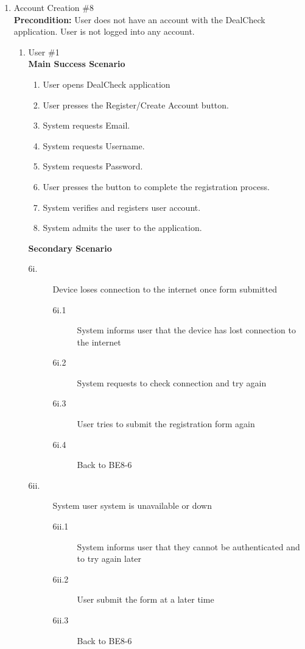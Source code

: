 \documentclass[]{article}
\begin{document}
\begin{enumerate}[{\bf {BE}1.}]
\item Account Creation \#8 \\
{\bf Precondition:} User does not have an account with the DealCheck application. User is not logged into any account.
\begin{enumerate}[{\bf VP1.}]
    \item User \#1 \\
    {\bf Main Success Scenario}
    \begin{enumerate}[1.]
        \item User opens DealCheck application
        \item User presses the Register/Create Account button.
        \item System requests Email.
        \item System requests Username.
        \item System requests Password.
        \item User presses the button to complete the registration process.
        \item System verifies and registers user account.
        \item System admits the user to the application.
        
    \end{enumerate}
    {\bf Secondary Scenario} \\
	\begin{description}
		\item [6i.] Device loses connection to the internet once form submitted
		\begin{description}
			\item [6i.1] System informs user that the device has lost connection to the internet
			\item [6i.2] System requests to check connection and try again
			\item [6i.3] User tries to submit the registration form again
			\item [6i.4] Back to BE8-6
		\end{description}

		\item [6ii.] System user system is unavailable or down
		\begin{description}
			\item [6ii.1] System informs user that they cannot be authenticated and to try again later
			\item [6ii.2] User submit the form at a later time
			\item [6ii.3] Back to BE8-6
		\end{description}


\end{description}
\end{enumerate}
\end{enumerate}
\end{document}
